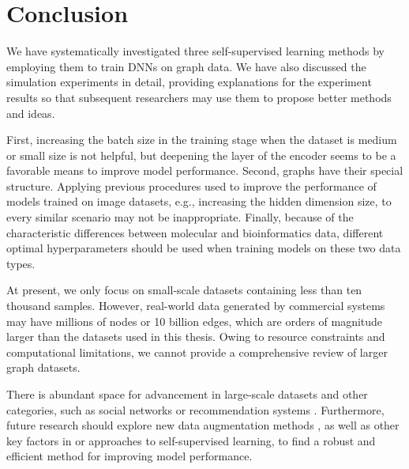 
\chapter{Conclusion}

We have systematically investigated three self-supervised learning methods by employing them to train DNNs on graph data. We have also discussed the simulation experiments in detail, providing explanations for the experiment results so that subsequent researchers may use them to propose better methods and ideas.

First, increasing the batch size in the training stage when the dataset is medium or small size is not helpful, but deepening the layer of the encoder seems to be a favorable means to improve model performance. Second, graphs have their special structure. Applying previous procedures used to improve the performance of models trained on image datasets, e.g., increasing the hidden dimension size, to every similar scenario may not be inappropriate. Finally, because of the characteristic differences between molecular and bioinformatics data, different optimal hyperparameters should be used when training models on these two data types.

At present, we only focus on small-scale datasets containing less than ten thousand samples. However, real-world data generated by commercial systems may have millions of nodes or 10 billion edges, which are orders of magnitude larger than the datasets used in this thesis. Owing to resource constraints and computational limitations, we cannot provide a comprehensive review of larger graph datasets. 

There is abundant space for advancement in large-scale datasets \cite{choi2022triangular} and other categories, such as social networks or recommendation systems \cite{mahcl}. Furthermore, future research should explore new data augmentation methods \cite{yang2022contrastive, shen2022improving}, as well as other key factors in or approaches \cite{hou2022graphmae} to self-supervised learning, to find a robust and efficient method for improving model performance.


